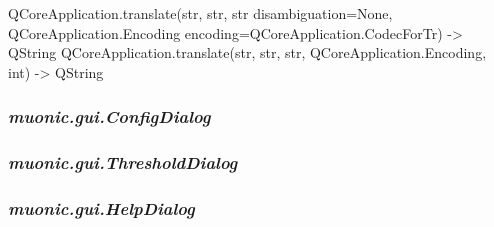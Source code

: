 \documentclass[letterpaper,10pt,english]{sphinxmanual}
\begin{document}

\begin{fulllineitems}
\label{muonic:muonic.gui.TabWidget.tr}
QCoreApplication.translate(str, str, str disambiguation=None, QCoreApplication.Encoding encoding=QCoreApplication.CodecForTr) -\textgreater{} QString
QCoreApplication.translate(str, str, str, QCoreApplication.Encoding, int) -\textgreater{} QString

\end{fulllineitems}



\subsubsection{\emph{muonic.gui.ConfigDialog}}
\label{muonic:muonic-gui-configdialog}\label{muonic:module-muonic.gui.ConfigDialog}

\begin{fulllineitems}
\label{muonic:muonic.gui.ConfigDialog.ConfigDialog}
\end{fulllineitems}



\subsubsection{\emph{muonic.gui.ThresholdDialog}}
\label{muonic:module-muonic.gui.ThresholdDialog}\label{muonic:muonic-gui-thresholddialog}

\begin{fulllineitems}
\label{muonic:muonic.gui.ThresholdDialog.ThresholdDialog}
\end{fulllineitems}



\subsubsection{\emph{muonic.gui.HelpDialog}}
\label{muonic:muonic-gui-helpdialog}\label{muonic:module-muonic.gui.HelpDialog}
\end{document}
